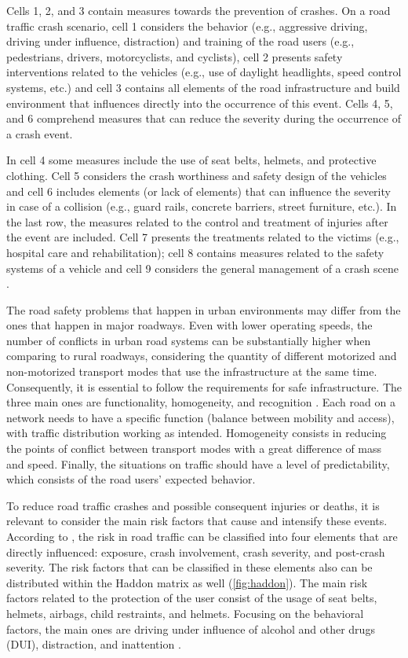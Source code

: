 Cells 1, 2, and 3 contain measures towards the prevention of crashes. On a road traffic crash scenario, cell 1 considers the behavior (e.g., aggressive driving, driving under influence, distraction) and training of the road users (e.g., pedestrians, drivers, motorcyclists, and cyclists), cell 2 presents safety interventions related to the vehicles (e.g., use of daylight headlights, speed control systems, etc.) and cell 3 contains all elements of the road infrastructure and build environment that influences directly into the occurrence of this event. Cells 4, 5, and 6 comprehend measures that can reduce the severity during the occurrence of a crash event.

In cell 4 some measures include the use of seat belts, helmets, and protective clothing. Cell 5 considers the crash worthiness and safety design of the vehicles and cell 6 includes elements (or lack of elements) that can influence the severity in case of a collision (e.g., guard rails, concrete barriers, street furniture, etc.). In the last row, the measures related to the control and treatment of injuries after the event are included. Cell 7 presents the treatments related to the victims (e.g., hospital care and rehabilitation); cell 8 contains measures related to the safety systems of a vehicle and cell 9 considers the general management of a crash scene \cite{Mohan2016}. 

The road safety problems that happen in urban environments may differ from the ones that happen in major roadways. Even with lower operating speeds, the number of conflicts in urban road systems can be substantially higher when comparing to rural roadways, considering the quantity of different motorized and non-motorized transport modes that use the infrastructure at the same time. Consequently, it is essential to follow the requirements for safe infrastructure. The three main ones are functionality, homogeneity, and recognition \cite{SWOV2003}. Each road on a network needs to have a specific function (balance between mobility and access), with traffic distribution working as intended. Homogeneity consists in reducing the points of conflict between transport modes with a great difference of mass and speed. Finally, the situations on traffic should have a level of predictability, which consists of the road users' expected behavior. 

To reduce road traffic crashes and possible consequent injuries or deaths, it is relevant to consider the main risk factors that cause and intensify these events. According to \textcite{WHO2004}, the risk in road traffic can be classified into four elements that are directly influenced: exposure, crash involvement, crash severity, and post-crash severity. The risk factors that can be classified in these elements also can be distributed within the Haddon matrix as well (\autoref{fig:haddon}). The main risk factors related to the protection of the user consist of the usage of seat belts, helmets, airbags, child restraints, and helmets. Focusing on the behavioral factors, the main ones are driving under influence of alcohol and other drugs (DUI), distraction, and inattention \cite{Shinar2017}.

